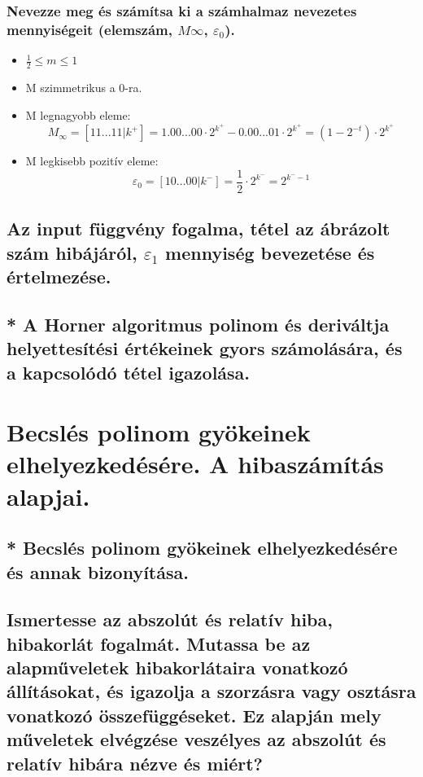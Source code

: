 \documentclass{article}
\begin{document}
            \subsubsection{Nevezze meg és számítsa ki a számhalmaz nevezetes mennyiségeit (elemszám, $M\infty$, $\varepsilon_0$).}

            \begin{itemize}
                \item $\frac{1}{2} \leq m \leq 1$
                \item M szimmetrikus a 0-ra.
                \item M legnagyobb eleme: \[M_\infty = [11...11|k^+] = 1.00...00\cdot2^{k^+}-0.00...01\cdot2^{k^+} = (1-2^{-t})\cdot2^{k^+}\]
                \item M legkisebb pozitív eleme: \[\varepsilon_0 = [10...00|k^-] = \frac{1}{2} \cdot 2^{k^-} = 2^{k^--1}\]
            \end{itemize}


        \subsection{Az input függvény fogalma, tétel az ábrázolt szám hibájáról, $\varepsilon_1$ mennyiség bevezetése és értelmezése.}
        
        
        \subsection{* A Horner algoritmus polinom és deriváltja helyettesítési értékeinek gyors számolására, és a kapcsolódó tétel igazolása.}


    \section{Becslés polinom gyökeinek elhelyezkedésére. A hibaszámítás alapjai.}
        \subsection{* Becslés polinom gyökeinek elhelyezkedésére és annak bizonyítása.}
        \subsection{Ismertesse az abszolút és relatív hiba, hibakorlát fogalmát. Mutassa be az alapműveletek hibakorlátaira vonatkozó állításokat, és igazolja a szorzásra vagy osztásra vonatkozó összefüggéseket. Ez alapján mely műveletek elvégzése veszélyes az abszolút és relatív hibára nézve és miért?}
\end{document}
